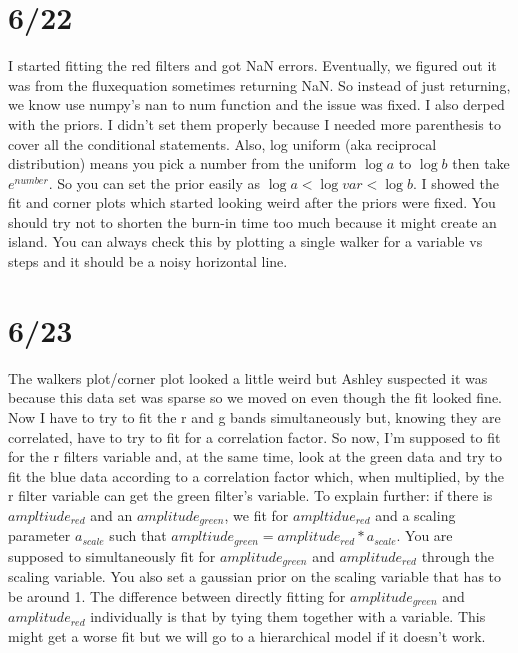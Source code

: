 \documentclass[12pt]{article}
\begin{document}
\section{6/22}
I started fitting the red filters and got NaN errors. Eventually, we figured out it was from the fluxequation sometimes returning NaN. So instead of just returning, we know use numpy's nan to num function and the issue was fixed. I also derped with the priors. I didn't set them properly because I needed more parenthesis to cover all the conditional statements. Also, log uniform (aka reciprocal distribution) means you pick a number from the uniform $\log a$ to $\log b$ then take $e^{number}$. So you can set the prior easily as $\log a < \log {var} < \log b$. I showed the fit and corner plots which started looking weird after the priors were fixed. You should try not to shorten the burn-in time too much because it might create an island. You can always check this by plotting a single walker for a variable vs steps and it should be a noisy horizontal line. 

\section{6/23}
The walkers plot/corner plot looked a little weird but Ashley suspected it was because this data set was sparse so we moved on even though the fit looked fine. Now I have to try to fit the r and g bands simultaneously but, knowing they are correlated, have to try to fit for a correlation factor. So now, I'm supposed to fit for the r filters variable and, at the same time, look at the green data and try to fit the blue data according to a correlation factor which, when multiplied, by the r filter variable can get the green filter's variable. To explain further: if there is $ampltiude_{red}$ and an $amplitude_{green}$, we fit for $ampltidue_{red}$ and a scaling parameter $a_{scale}$ such that $ampltiude_{green} = amplitude_{red} * a_{scale}$. You are supposed to simultaneously fit for $amplitude_{green}$ and $amplitude_{red}$ through the scaling variable. You also set a gaussian prior on the scaling variable that has to be around 1. The difference between directly fitting for $amplitude_{green}$ and $amplitude_{red}$ individually is that by tying them together with a variable. This might get a worse fit but we will go to a hierarchical model if it doesn't work.  
\end{document}
